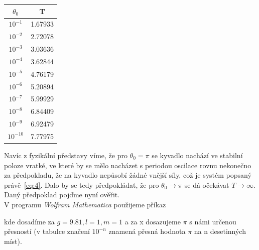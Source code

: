 \documentclass[reqno, a4paper]{amsart}
\begin{document}
	\begin{table}
		\begin{minipage}{\textwidth}
			\begin{minipage}[b]{0.25\textwidth}
				\centering
				\begin{tabular}{|c|c|}
					\hline
					$\theta_{0}$ & T \\ 
					\hline
					$ 10^{-1} $& 1.67933\\$ 10^{-2} $& 2.72078\\$ 10^{-3} $& 3.03636\\$ 10^{-4} $& 3.62844\\$ 10^{-5} $& 4.76179\\$ 10^{-6} $& 5.20894\\$ 10^{-7} $& 5.99929\\$ 10^{-8} $& 6.84409\\$ 10^{-9} $& 6.92479\\$ 10^{-10} $& 7.77975\\
					\hline
				\end{tabular}
			\end{minipage}
			\hfill
		\end{minipage}
	\end{table}
	
	Navíc z fyzikální představy víme, že pro $\theta_{0}=\pi$ se kyvadlo nachází ve stabilní poloze vratké, ve které by se mělo nacházet s periodou oscilace rovnu nekonečno za předpokladu, že na kyvadlo nepůsobí žádné vnější síly, což je systém popsaný právě~\eqref{eq:4}.
	Dalo by se tedy předpokládat, že pro $\theta_{0} \longrightarrow \pi$ se dá očekávat $T\longrightarrow \infty $. Daný předpoklad pojďme nyní ověřit.\\
	V programu \textit{Wolfram Mathematica} použijeme příkaz
	\begin{verbatim*}
		
		NDSolve[{(g*Sin[y[t]])/l+(y^\[Prime]\[Prime])[t]==0, 
			Derivative[1][y][0]==0,y[0]==x,WhenEvent[y[t]==0,{Print[t],
				"StopIntegration"}]},y,{t,0,50}],
		
	\end{verbatim*}
	kde dosadíme za $ g=9.81, l=1, m=1$  a za x dosazujeme $ \pi $ s námi určenou přesností (v tabulce značení $ 10^{-n} $ znamená přesná hodnota $ \pi $ na n desetinných míst).
	\\
	\\
	\\
	\\
	
\end{document}
